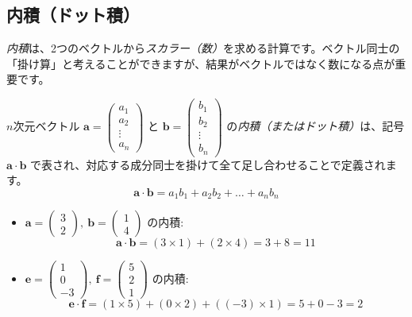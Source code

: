 \subsection{内積（ドット積）}
\emph{内積}は、2つのベクトルから\emph{スカラー（数）}を求める計算です。ベクトル同士の「掛け算」と考えることができますが、結果がベクトルではなく数になる点が重要です。
\begin{dfn}[内積 - 成分による計算]
$n$次元ベクトル $\bm{a} = \begin{pmatrix} a_1 \\ a_2 \\ \vdots \\ a_n \end{pmatrix}$ と $\bm{b} = \begin{pmatrix} b_1 \\ b_2 \\ \vdots \\ b_n \end{pmatrix}$ の\emph{内積（またはドット積）}は、記号 $\bm{a} \cdot \bm{b}$ で表され、対応する成分同士を掛けて全て足し合わせることで定義されます。
\[\bm{a} \cdot \bm{b} = a_1 b_1 + a_2 b_2 + \dots + a_n b_n\]
\end{dfn}
\begin{ex}
\begin{itemize}
\item $\bm{a} = \begin{pmatrix} 3 \\ 2 \end{pmatrix},\ \bm{b} = \begin{pmatrix} 1 \\ 4 \end{pmatrix}$ の内積:
    \[\bm{a} \cdot \bm{b} = (3 \times 1) + (2 \times 4) = 3 + 8 = 11\]

\item $\bm{e} = \begin{pmatrix} 1 \\ 0 \\ -3 \end{pmatrix},\ \bm{f} = \begin{pmatrix} 5 \\ 2 \\ 1 \end{pmatrix}$ の内積:
    \[\bm{e} \cdot \bm{f} = (1 \times 5) + (0 \times 2) + ((-3) \times 1) = 5 + 0 - 3 = 2\]
\end{itemize}
\end{ex}

